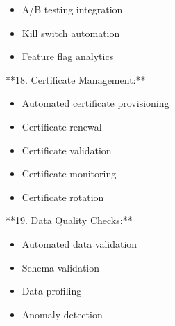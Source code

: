 \documentclass[11pt,a4paper]{article}
\begin{document}
\begin{itemize}
\item A/B testing integration
\end{itemize}

\begin{itemize}
\item Kill switch automation
\end{itemize}

\begin{itemize}
\item Feature flag analytics
\end{itemize}

**18. Certificate Management:**

\begin{itemize}
\item Automated certificate provisioning
\end{itemize}

\begin{itemize}
\item Certificate renewal
\end{itemize}

\begin{itemize}
\item Certificate validation
\end{itemize}

\begin{itemize}
\item Certificate monitoring
\end{itemize}

\begin{itemize}
\item Certificate rotation
\end{itemize}

**19. Data Quality Checks:**

\begin{itemize}
\item Automated data validation
\end{itemize}

\begin{itemize}
\item Schema validation
\end{itemize}

\begin{itemize}
\item Data profiling
\end{itemize}

\begin{itemize}
\item Anomaly detection
\end{itemize}
\end{document}

